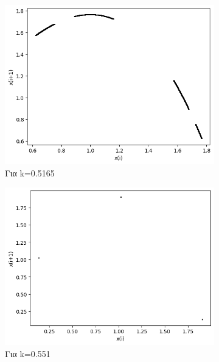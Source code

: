 \begin{figure}[h!]
\begin{subfigure}[b]{0.25\textwidth}
		\includegraphics[width=\textwidth]{LateX images/graphs q03/g67}
		\caption{Για k=0.5165}
		\label{f:k19}
	\end{subfigure}
	\hfill
	\begin{subfigure}[b]{0.25\textwidth}
		\centering
		\includegraphics[width=\textwidth]{LateX images/graphs q03/g8}
		\caption{Για k=0.551}
		\label{f:k20}
	\end{subfigure}
	\hfill
	\begin{subfigure}[b]{0.25\textwidth}
		\centering

\end{subfigure}
\end{figure}
